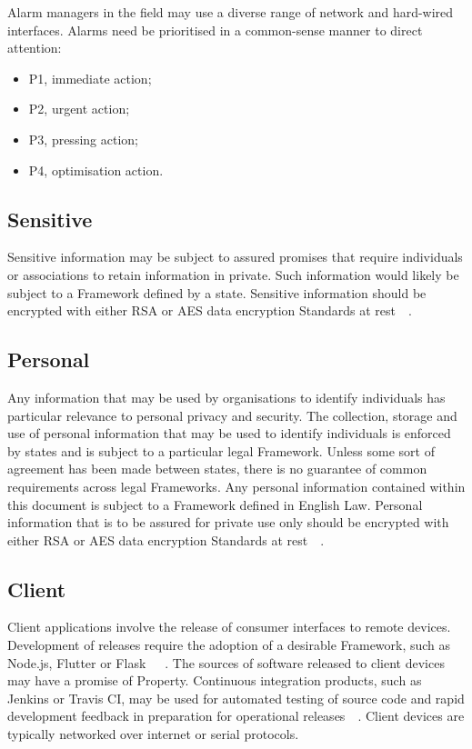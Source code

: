 \documentclass[11pt, oneside]{article}   	%
\begin{document}
Alarm managers in the field may use a diverse range of network and hard-wired interfaces.
Alarms need be prioritised in a common-sense manner to direct attention:

\begin{itemize}
	\item P1, immediate action; 
	\item P2, urgent action;
	\item P3, pressing action;
	\item P4, optimisation action.
\end{itemize}

\subsection{Sensitive}
Sensitive information may be subject to assured promises that require individuals or associations to retain information in private.
Such information would likely be subject to a Framework defined by a state.
Sensitive information should be encrypted with either RSA or AES data encryption Standards at rest~\cite{rsa}~\cite{aes}.

\subsection{Personal}
Any information that may be used by organisations to identify individuals has particular relevance to personal privacy and security.
The collection, storage and use of personal information that may be used to identify individuals is enforced by states and is subject to a particular legal Framework.
Unless some sort of agreement has been made between states, there is no guarantee of common requirements across legal Frameworks.
Any personal information contained within this document is subject to a Framework defined in English Law.
Personal information that is to be assured for private use only should be encrypted with either RSA or AES data encryption Standards at rest~\cite{rsa}~\cite{aes}.

\subsection{Client}
Client applications involve the release of consumer interfaces to remote devices.
Development of releases require the adoption of a desirable Framework, such as Node.js, Flutter or Flask~\cite{node}~\cite{flutter}~\cite{flask}.
The sources of software released to client devices may have a promise of Property.
Continuous integration products, such as Jenkins or Travis CI, may be used for automated testing of source code and rapid development feedback in preparation for operational releases~\cite{jenkins}~\cite{travis}.
Client devices are typically networked over internet or serial protocols.\
\end{document}
